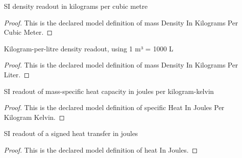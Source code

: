 \begin{definition}
  \label{def:physics:phyx-mini-0485:phyxminiproblems-problemphyxmini0485-massdensityinkilogramspercubicmeter}
  SI density readout in kilograms per cubic metre
\end{definition}
\begin{proof}
  This is the declared model definition of mass Density In Kilograms Per Cubic Meter.
\end{proof}
\begin{definition}
  \label{def:physics:phyx-mini-0485:phyxminiproblems-problemphyxmini0485-massdensityinkilogramsperliter}
  Kilogram-per-litre density readout, using 1 m³ = 1000 L
\end{definition}
\begin{proof}
  This is the declared model definition of mass Density In Kilograms Per Liter.
\end{proof}
\begin{definition}
  \label{def:physics:phyx-mini-0485:phyxminiproblems-problemphyxmini0485-specificheatinjoulesperkilogramkelvin}
  SI readout of mass-specific heat capacity in joules per kilogram-kelvin
\end{definition}
\begin{proof}
  This is the declared model definition of specific Heat In Joules Per Kilogram Kelvin.
\end{proof}
\begin{definition}
  \label{def:physics:phyx-mini-0485:phyxminiproblems-problemphyxmini0485-heatinjoules}
  SI readout of a signed heat transfer in joules
\end{definition}
\begin{proof}
  This is the declared model definition of heat In Joules.
\end{proof}
